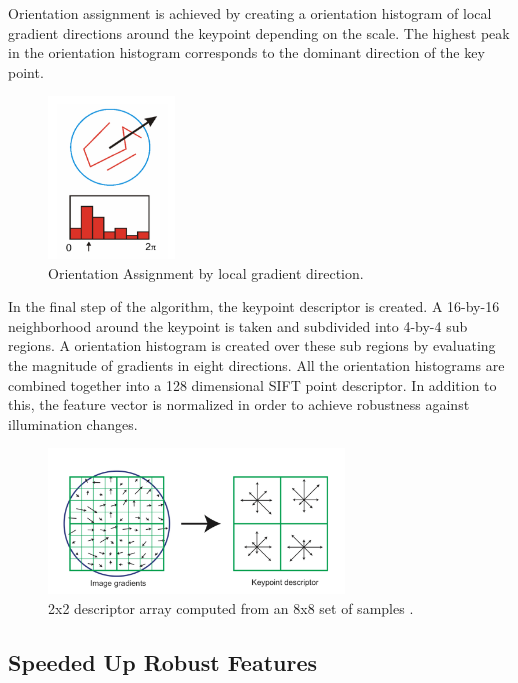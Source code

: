 \documentclass{l4proj}
\begin{document}
Orientation assignment is achieved by creating a orientation histogram of local gradient directions around the keypoint depending on the scale. The highest peak in the orientation histogram corresponds to the dominant direction of the key point.

\begin{figure}[ht]
    \centering
    \includegraphics[width=0.3\textwidth]{l4template-master/images/orientationAssignment.png}
    \caption{Orientation Assignment by local gradient direction. \citep{Lowe04}}
    \label{orientationassignment}
\end{figure}

In the final step of the algorithm, the keypoint descriptor is created.  A 16-by-16 neighborhood around the keypoint is taken and subdivided into 4-by-4 sub regions. A orientation histogram is created over these sub regions by evaluating the magnitude of gradients in eight directions. All the orientation histograms are combined together into a 128 dimensional SIFT point descriptor. In addition to this, the feature vector is normalized in order to achieve robustness against illumination changes. 

\begin{figure}[ht]
    \centering
    \includegraphics[width=0.7\textwidth]{l4template-master/images/keypointDescriptor.png}
    \caption{2x2 descriptor array computed from an 8x8 set of samples \citep{Lowe04}.}
    \label{keypointdescriptor}
\end{figure}


\subsection{Speeded Up Robust Features}
\end{document}
